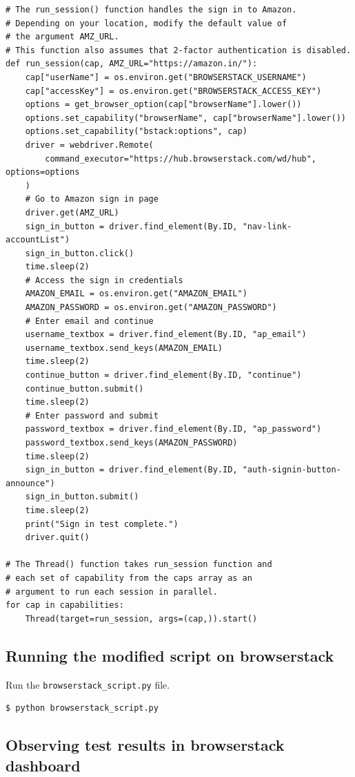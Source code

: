 \documentclass{article}
\begin{document}
\begin{lstlisting}[style=python]
# The run_session() function handles the sign in to Amazon.
# Depending on your location, modify the default value of 
# the argument AMZ_URL.
# This function also assumes that 2-factor authentication is disabled.
def run_session(cap, AMZ_URL="https://amazon.in/"):
    cap["userName"] = os.environ.get("BROWSERSTACK_USERNAME")
    cap["accessKey"] = os.environ.get("BROWSERSTACK_ACCESS_KEY")
    options = get_browser_option(cap["browserName"].lower())
    options.set_capability("browserName", cap["browserName"].lower())
    options.set_capability("bstack:options", cap)
    driver = webdriver.Remote(
        command_executor="https://hub.browserstack.com/wd/hub", options=options
    )
    # Go to Amazon sign in page
    driver.get(AMZ_URL)
    sign_in_button = driver.find_element(By.ID, "nav-link-accountList")
    sign_in_button.click()
    time.sleep(2)
    # Access the sign in credentials
    AMAZON_EMAIL = os.environ.get("AMAZON_EMAIL")
    AMAZON_PASSWORD = os.environ.get("AMAZON_PASSWORD")
    # Enter email and continue
    username_textbox = driver.find_element(By.ID, "ap_email")
    username_textbox.send_keys(AMAZON_EMAIL)
    time.sleep(2)
    continue_button = driver.find_element(By.ID, "continue")
    continue_button.submit()
    time.sleep(2)
    # Enter password and submit
    password_textbox = driver.find_element(By.ID, "ap_password")
    password_textbox.send_keys(AMAZON_PASSWORD)
    time.sleep(2)
    sign_in_button = driver.find_element(By.ID, "auth-signin-button-announce")
    sign_in_button.submit()
    time.sleep(2)
    print("Sign in test complete.")
    driver.quit()

# The Thread() function takes run_session function and
# each set of capability from the caps array as an
# argument to run each session in parallel.
for cap in capabilities:
    Thread(target=run_session, args=(cap,)).start()
\end{lstlisting}

\subsection*{Running the modified script on browserstack}

Run the \texttt{browserstack\_script.py} file.

\begin{lstlisting}[style=bash]
$ python browserstack_script.py
\end{lstlisting}

\subsection*{Observing test results in browserstack dashboard}
\end{document}

